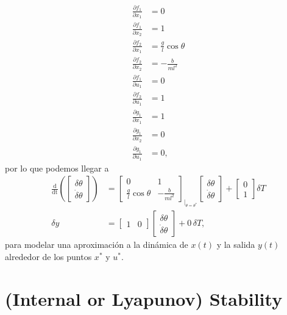 \begin{align}
\frac{\partial f_1}{\partial x_1} &= 0 \nonumber \\
\frac{\partial f_1}{\partial x_2} &= 1 \nonumber \\
\frac{\partial f_2}{\partial x_1} &= \frac{g}{l}\cos\theta \nonumber \\
\frac{\partial f_2}{\partial x_2} &= -\frac{b}{ml^2} \nonumber \\
\frac{\partial f_1}{\partial u_1} &= 0 \nonumber \\
\frac{\partial f_2}{\partial u_1} &= 1 \nonumber \\
\frac{\partial g_1}{\partial x_1} &= 1 \nonumber \\
\frac{\partial g_1}{\partial x_2} &= 0 \nonumber \\
\frac{\partial g_1}{\partial u_1} &= 0, \nonumber
\end{align}
por lo que podemos llegar a
\begin{align}
	\frac{\mathrm{d}}{\mathrm{dt}}\left(\begin{bmatrix}\delta\theta \\ \dot\delta\theta \end{bmatrix}\right) &= \begin{bmatrix}0 & 1 \\ \frac{g}{l}\cos\theta & -\frac{b}{ml^2} \end{bmatrix}_{|_{\theta=\theta^*}} \begin{bmatrix}\delta\theta \\ \dot\delta\theta \end{bmatrix} + \begin{bmatrix}0 \\ 1 \end{bmatrix} \delta T \nonumber \\
		\delta y &= \begin{bmatrix}1 & 0\end{bmatrix}\begin{bmatrix}\delta\theta \\ \dot\delta\theta \end{bmatrix} + 0 \, \delta T,
\end{align}
para modelar una aproximación a la dinámica de $x(t)$ y la salida $y(t)$ alrededor de los puntos $x^*$ y $u^*$.

\section{(Internal or Lyapunov) Stability}
\label{sec: sta}

